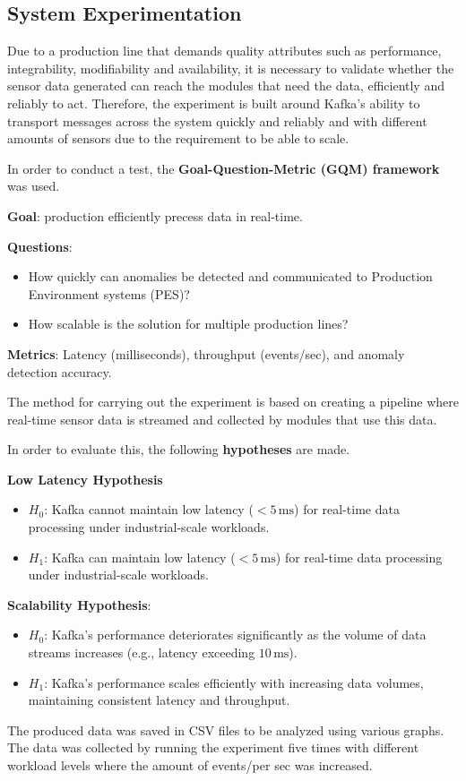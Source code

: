 \subsection{System Experimentation}
Due to a production line that demands quality attributes such as performance, integrability, modifiability and availability, it is necessary to validate whether the sensor data generated can reach the modules that need the data, efficiently and reliably to act. Therefore, the experiment is built around Kafka's ability to transport messages across the system quickly and reliably and with different amounts of sensors due to the requirement to be able to scale.

In order to conduct a test, the \textbf{Goal-Question-Metric (GQM) framework} was used.

\textbf{Goal}: production efficiently precess data in real-time.

\textbf{Questions}:
\begin{itemize}
    \item How quickly can anomalies be detected and communicated to Production Environment systems (PES)?
    \item How scalable is the solution for multiple production lines?
\end{itemize}
\textbf{Metrics}: Latency (milliseconds), throughput (events/sec), and anomaly detection accuracy.

The method for carrying out the experiment is based on creating a pipeline where real-time sensor data is streamed and collected by modules that use this data.

In order to evaluate this, the following \textbf{hypotheses} are made.

\textbf{Low Latency Hypothesis}
\begin{itemize}
    \item \( H_0 \): Kafka cannot maintain low latency (\(< 5 \, \text{ms}\)) for real-time data processing under industrial-scale workloads.
    \item \( H_1 \): Kafka can maintain low latency (\(< 5 \, \text{ms}\)) for real-time data processing under industrial-scale workloads.
\end{itemize}
\textbf{Scalability Hypothesis}:
\begin{itemize}
    \item \( H_0 \): Kafka’s performance deteriorates significantly as the volume of data streams increases (e.g., latency exceeding \(10 \, \text{ms}\)).
    \item \( H_1 \): Kafka’s performance scales efficiently with increasing data volumes, maintaining consistent latency and throughput.
\end{itemize}
The produced data was saved in CSV files to be analyzed using various graphs. The data was collected by running the experiment five times with different workload levels where the amount of events/per sec was increased.


